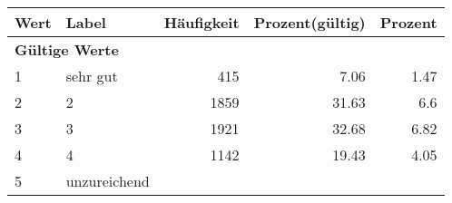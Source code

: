      \begin{longtable}{lXrrr}
     \toprule
     \textbf{Wert} & \textbf{Label} & \textbf{Häufigkeit} & \textbf{Prozent(gültig)} & \textbf{Prozent} \\
     \endhead
     \midrule
     \multicolumn{5}{l}{\textbf{Gültige Werte}}\\

     1 &
     \multicolumn{1}{X}{ sehr gut   } &


       \num{415} &
       \num[round-mode=places,round-precision=2]{7,06} &
         \num[round-mode=places,round-precision=2]{1,47} \\

     2 &
     \multicolumn{1}{X}{ 2   } &


       \num{1859} &
       \num[round-mode=places,round-precision=2]{31,63} &
         \num[round-mode=places,round-precision=2]{6,6} \\

     3 &
     \multicolumn{1}{X}{ 3   } &


       \num{1921} &
       \num[round-mode=places,round-precision=2]{32,68} &
         \num[round-mode=places,round-precision=2]{6,82} \\

     4 &
     \multicolumn{1}{X}{ 4   } &


       \num{1142} &
       \num[round-mode=places,round-precision=2]{19,43} &
         \num[round-mode=places,round-precision=2]{4,05} \\

     5 &
     \multicolumn{1}{X}{ unzureichend   } &



\end{longtable}
